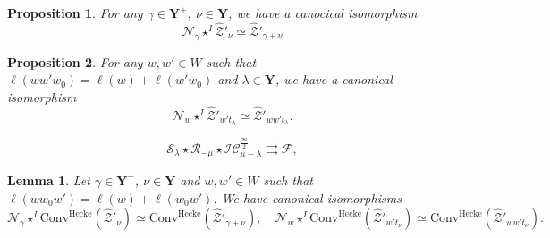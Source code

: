 \documentclass[10pt,a4paper]{amsart}
\newtheorem{lem}{Lemma}
\newtheorem{prop}{Proposition}
\begin{document}
	\begin{prop}\label{prop convolution costandard}
		For any  $\gamma\in\mathbf{Y}^+,~\nu\in\mathbf{Y}$, we have a canocical isomorphism
		$$ \mathcal{N}_\gamma\star^I\widehat{\mathcal{Z}}'_\nu\simeq \widehat{\mathcal{Z}}'_{\gamma+\nu} $$
	\end{prop}

 \begin{prop}\label{prop convolution costandard 2}
     For any $w,w'\in W$ such that $\ell(ww'w_0)=\ell(w)+\ell(w'w_0)$ and $\lambda\in \mathbf{Y}$, we have a canonical isomorphism
     $$ \mathcal{N}_{w}\star^I\widehat{\mathcal{Z}}'_{w't_\lambda}\simeq \widehat{\mathcal{Z}}'_{ww't_\lambda}. $$
 \end{prop}

	\begin{equation}\label{diagram coeq}
		\mathcal{S}_\lambda\star\mathcal{R}_{-\mu}\star\mathcal{IC}^{\frac{\infty}{2}}_{\mu-\lambda}\rightrightarrows\mathcal{F}, 
	\end{equation}

\begin{lem}\label{lem commute convo}
    Let $\gamma\in\mathbf{Y}^+$, $\nu\in\mathbf{Y}$ and  $w,w'\in W$ such that $\ell(ww_0w')=\ell(w)+\ell(w_0w')$. We have canonical isomorphisms
    $$ \mathcal{N}_\gamma\star^I\mathrm{Conv}^{\mathrm{Hecke}}(\widehat{\mathcal{Z}}'_\nu)\simeq \mathrm{Conv}^{\mathrm{Hecke}}(\widehat{\mathcal{Z}}'_{\gamma+\nu}),\quad\mathcal{N}_w\star^I\mathrm{Conv}^{\mathrm{Hecke}}(\widehat{\mathcal{Z}}'_{w't_\nu})\simeq \mathrm{Conv}^{\mathrm{Hecke}}(\widehat{\mathcal{Z}}'_{ww't_\nu}).$$
\end{lem}
\end{document}
